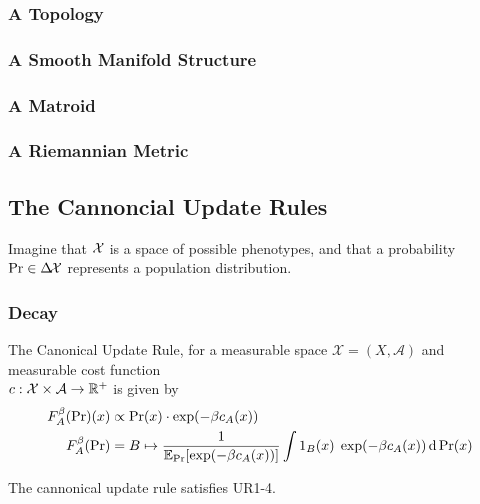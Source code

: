 \documentclass{article}
\begin{document}
\subsubsection*{A Topology}
\subsubsection*{A Smooth Manifold Structure}
\subsubsection*{A Matroid}
\subsubsection*{A Riemannian Metric}



\subsection{The Cannoncial Update Rules}
Imagine that $\mathcal X$ is a space of possible phenotypes, and that a probability $\Pr \in \Delta\!\mathcal X$ represents a population distribution. 

\subsubsection{Decay}
The Canonical Update Rule, for a measurable space $\mathcal X = (X, \mathcal A)$ and measurable cost function\\
$c: \mathcal X\times\mathcal A \to \mathbb R^+$ is given by
\def\cost#1#2{c_{#2}(#1)}
\begin{align*}
    F^\beta_A(\Pr)(x) &\propto \Pr(x) \cdot \exp(-\beta \cost xA) \\
    F^\beta_A(\Pr) &= B \mapsto \frac{1}{\Ex_{\Pr}[\exp(-\beta \cost xA )]}
        \int 1_B(x) \; \exp(-\beta \cost xA ) \,\mathrm d\Pr(x)
\end{align*}
\begin{prop}
    The cannonical update rule satisfies UR1-4.
\end{prop}
\end{document}
